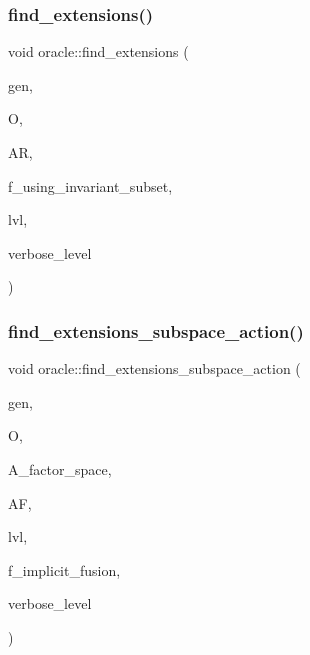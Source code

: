 \subsubsection{\texorpdfstring{find\+\_\+extensions()}{find\_extensions()}}
{\footnotesize\ttfamily void oracle\+::find\+\_\+extensions (\begin{DoxyParamCaption}\item[{\mbox{\hyperlink{classgenerator}{generator}} $\ast$}]{gen,  }\item[{\mbox{\hyperlink{classschreier}{schreier}} \&}]{O,  }\item[{\mbox{\hyperlink{classaction}{action}} \&}]{AR,  }\item[{\mbox{\hyperlink{galois_8h_a09fddde158a3a20bd2dcadb609de11dc}{I\+NT}}}]{f\+\_\+using\+\_\+invariant\+\_\+subset,  }\item[{\mbox{\hyperlink{galois_8h_a09fddde158a3a20bd2dcadb609de11dc}{I\+NT}}}]{lvl,  }\item[{\mbox{\hyperlink{galois_8h_a09fddde158a3a20bd2dcadb609de11dc}{I\+NT}}}]{verbose\+\_\+level }\end{DoxyParamCaption})}

\mbox{\label{classoracle_a7fde1637fd91cd998a4857c135a6c512}} 
\subsubsection{\texorpdfstring{find\+\_\+extensions\+\_\+subspace\+\_\+action()}{find\_extensions\_subspace\_action()}}
{\footnotesize\ttfamily void oracle\+::find\+\_\+extensions\+\_\+subspace\+\_\+action (\begin{DoxyParamCaption}\item[{\mbox{\hyperlink{classgenerator}{generator}} $\ast$}]{gen,  }\item[{\mbox{\hyperlink{classschreier}{schreier}} \&}]{O,  }\item[{\mbox{\hyperlink{classaction}{action}} $\ast$}]{A\+\_\+factor\+\_\+space,  }\item[{\mbox{\hyperlink{classaction__on__factor__space}{action\+\_\+on\+\_\+factor\+\_\+space}} $\ast$}]{AF,  }\item[{\mbox{\hyperlink{galois_8h_a09fddde158a3a20bd2dcadb609de11dc}{I\+NT}}}]{lvl,  }\item[{\mbox{\hyperlink{galois_8h_a09fddde158a3a20bd2dcadb609de11dc}{I\+NT}}}]{f\+\_\+implicit\+\_\+fusion,  }\item[{\mbox{\hyperlink{galois_8h_a09fddde158a3a20bd2dcadb609de11dc}{I\+NT}}}]{verbose\+\_\+level }\end{DoxyParamCaption})}


